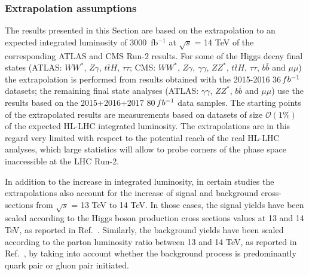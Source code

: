 \subsubsection{Extrapolation assumptions}
\label{sec:HiggsExtrapAss}

The results presented in this Section are based on the extrapolation to an expected integrated luminosity of 3000~fb$^{-1}$ at $\sqrt{s}$ = 14 TeV of the corresponding ATLAS and CMS Run-2 results. For some of the Higgs decay final states (ATLAS: $WW^*$, $Z\gamma$, $t\bar{t}H$, $\tau\tau$; CMS: $WW^*$, $Z\gamma$, $\gamma\gamma$, $ZZ^*$, $t\bar{t}H$, $\tau\tau$, $b\bar{b}$ and $\mu\mu$) the extrapolation is performed from results obtained with the 2015-2016 36\,$fb^{-1}$ datasets; the remaining final state analyses (ATLAS: $\gamma\gamma$, $ZZ^*$, $b\bar{b}$ and $\mu\mu$) use the results based on the 2015+2016+2017 80\,$fb^{-1}$ data samples. The starting points of the extrapolated results are measurements based on datasets of size $\mathcal{O}(1\%)$ of the expected HL-LHC integrated luminosity. The extrapolations are in this regard very limited with respect to the potential reach of the real HL-LHC analyses, which large statistics will allow to probe corners of the phase space inaccessible at the LHC Run-2.
    
In addition to the increase in integrated luminosity, in certain studies the extrapolations also account for the increase of signal and background cross-sections from $\sqrt{s}$ = 13 TeV to 14 TeV.  In those cases, the signal yields have been scaled according to the Higgs boson production cross sections values at 13 and 14 TeV, as reported in Ref.~\cite{deFlorian:2016spz}. Similarly, the background yields have been scaled according to the parton luminosity ratio between 13 and 14 TeV, as reported in Ref.~\cite{Heinemeyer:2013tqa}, by taking into account whether the background process is predominantly quark pair or gluon pair initiated.

